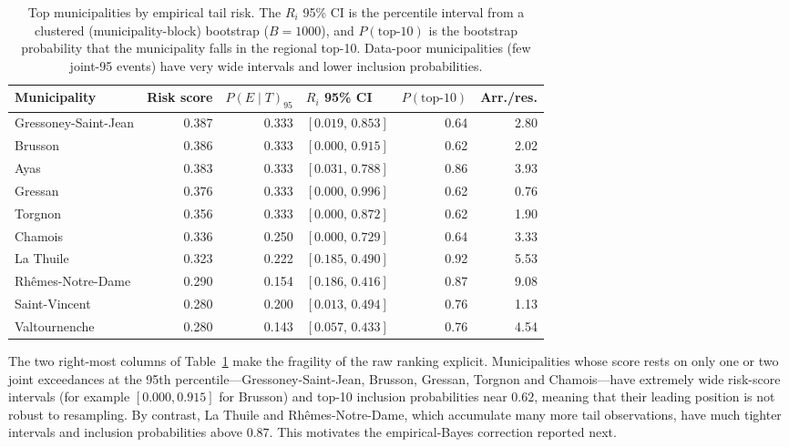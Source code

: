 \documentclass[11pt,a4paper]{article}
\begin{document}
\begin{table}[H]
\centering
\small
\caption{Top municipalities by empirical tail risk. The $R_i$ 95\% CI is the percentile interval from a clustered (municipality-block) bootstrap ($B=1000$), and $P(\text{top-}10)$ is the bootstrap probability that the municipality falls in the regional top-10. Data-poor municipalities (few joint-95 events) have very wide intervals and lower inclusion probabilities.}
\label{tab:top-tailrisk}
\begin{tabular}{lrrlrr}
\toprule
Municipality & Risk score & $P(E\mid T)_{95}$ & $R_i$ 95\% CI & $P(\text{top-}10)$ & Arr./res. \\
\midrule
Gressoney-Saint-Jean & 0.387 & 0.333 & $[0.019,\,0.853]$ & 0.64 & 2.80 \\
Brusson & 0.386 & 0.333 & $[0.000,\,0.915]$ & 0.62 & 2.02 \\
Ayas & 0.383 & 0.333 & $[0.031,\,0.788]$ & 0.86 & 3.93 \\
Gressan & 0.376 & 0.333 & $[0.000,\,0.996]$ & 0.62 & 0.76 \\
Torgnon & 0.356 & 0.333 & $[0.000,\,0.872]$ & 0.62 & 1.90 \\
Chamois & 0.336 & 0.250 & $[0.000,\,0.729]$ & 0.64 & 3.33 \\
La Thuile & 0.323 & 0.222 & $[0.185,\,0.490]$ & 0.92 & 5.53 \\
Rh\^emes-Notre-Dame & 0.290 & 0.154 & $[0.186,\,0.416]$ & 0.87 & 9.08 \\
Saint-Vincent & 0.280 & 0.200 & $[0.013,\,0.494]$ & 0.76 & 1.13 \\
Valtournenche & 0.280 & 0.143 & $[0.057,\,0.433]$ & 0.76 & 4.54 \\
\bottomrule
\end{tabular}
\end{table}

The two right-most columns of Table~\ref{tab:top-tailrisk} make the fragility of the raw ranking explicit. Municipalities whose score rests on only one or two joint exceedances at the 95th percentile---Gressoney-Saint-Jean, Brusson, Gressan, Torgnon and Chamois---have extremely wide risk-score intervals (for example $[0.000, 0.915]$ for Brusson) and top-10 inclusion probabilities near $0.62$, meaning that their leading position is not robust to resampling. By contrast, La Thuile and Rh\^emes-Notre-Dame, which accumulate many more tail observations, have much tighter intervals and inclusion probabilities above $0.87$. This motivates the empirical-Bayes correction reported next.
\end{document}
